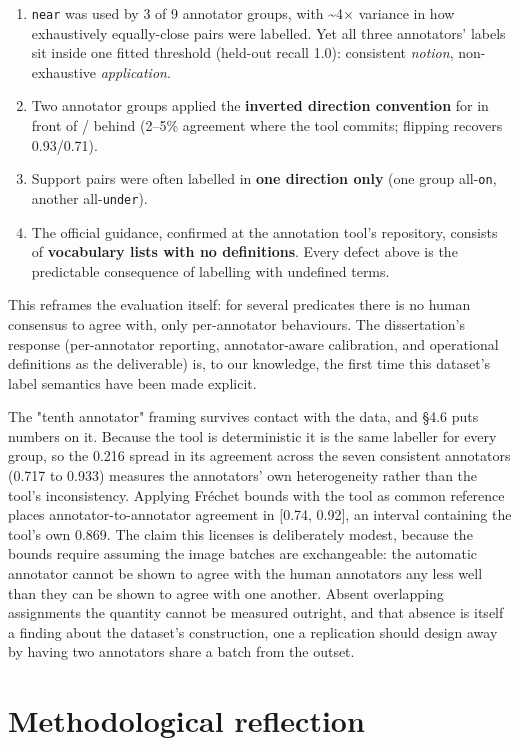 \begin{enumerate}
\item \texttt{near} was used by 3 of 9 annotator groups, with \textasciitilde{}4$\times$ variance in how
exhaustively equally-close pairs were labelled. Yet all three annotators' labels sit inside one fitted threshold (held-out recall 1.0): consistent \textit{notion}, non-exhaustive \textit{application}.
\item Two annotator groups applied the \textbf{inverted direction convention} for
in front of / behind (2--5\% agreement where the tool commits; flipping recovers 0.93/0.71).
\item Support pairs were often labelled in \textbf{one direction only} (one group
all-\texttt{on}, another all-\texttt{under}).
\item The official guidance, confirmed at the annotation tool's repository,
consists of \textbf{vocabulary lists with no definitions}. Every defect above is the predictable consequence of labelling with undefined terms.
\end{enumerate}

This reframes the evaluation itself: for several predicates there is no human consensus to agree with, only per-annotator behaviours. The dissertation's response (per-annotator reporting, annotator-aware calibration, and operational definitions as the deliverable) is, to our knowledge, the first time this dataset's label semantics have been made explicit.

The "tenth annotator" framing survives contact with the data, and \S4.6 puts numbers on it. Because the tool is deterministic it is the same labeller for every group, so the 0.216 spread in its agreement across the seven consistent annotators (0.717 to 0.933) measures the annotators' own heterogeneity rather than the tool's inconsistency. Applying Fréchet bounds with the tool as common reference places annotator-to-annotator agreement in [0.74, 0.92], an interval containing the tool's own 0.869. The claim this licenses is deliberately modest, because the bounds require assuming the image batches are exchangeable: the automatic annotator cannot be shown to agree with the human annotators any less well than they can be shown to agree with one another. Absent overlapping assignments the quantity cannot be measured outright, and that absence is itself a finding about the dataset's construction, one a replication should design away by having two annotators share a batch from the outset.

\section{Methodological reflection}

